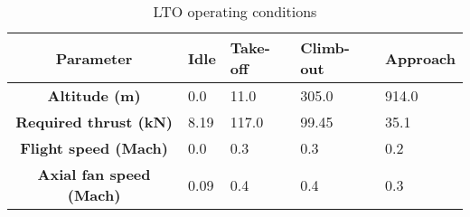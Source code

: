 \begin{table}[h!]
  \centering
  \begin{tabularx}{\textwidth}{||c|X|X|X|X||}
  \hline
    \cellcolor{gray!20}\textbf{Parameter} & \cellcolor{gray!20}\textbf{Idle} & \cellcolor{gray!20}\textbf{Take-off} & \cellcolor{gray!20}\textbf{Climb-out} & \cellcolor{gray!20}\textbf{Approach} \\ [0.5ex]
  \hline\hline
\centering
    \cellcolor{gray!20}\textbf{Altitude (m)} & 0.0 & 11.0 & 305.0 & 914.0 \\
  \hline
    \cellcolor{gray!20}\textbf{Required thrust (kN)} & 8.19 & 117.0 & 99.45 & 35.1 \\
  \hline
    \cellcolor{gray!20}\textbf{Flight speed (Mach)} & 0.0 & 0.3 & 0.3 & 0.2 \\
  \hline
    \cellcolor{gray!20}\textbf{Axial fan speed (Mach)} & 0.09 & 0.4 & 0.4 & 0.3 \\
  \hline
  \end{tabularx}
  \caption{LTO operating conditions}
  \label{tab:lto}
\end{table}
